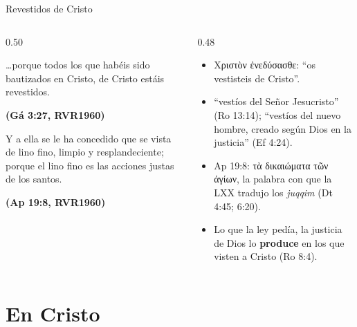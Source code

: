 \documentclass[hyperref={bookmarks=false},aspectratio=169]{beamer}
\newcommand{\grc}[1]{\foreignlanguage{ancientgreek}{#1}}
\newcommand{\fuente}[1]{\par\hfill{\upshape\bfseries\footnotesize\textcolor{azul}{#1}}}
\newcommand{\destacar}[1]{\textbf{\textcolor{azul}{#1}}}
\begin{document}
\begin{frame}{Revestidos de Cristo}
\begin{columns}[c,onlytextwidth]
\begin{column}{0.50\textwidth}
\begin{cita}\ldots{}porque todos los que habéis sido bautizados en Cristo, de Cristo estáis revestidos.\fuente{(Gá 3:27, RVR1960)}\end{cita}
\begin{cita}Y a ella se le ha concedido que se vista de lino fino, limpio y resplandeciente; porque el lino fino es las acciones justas de los santos.\fuente{(Ap 19:8, RVR1960)}\end{cita}
\end{column}
\begin{column}{0.48\textwidth}\small
\begin{itemize}
\item \grc{Χριστὸν ἐνεδύσασθε}: ``os vestisteis de Cristo''.
\item ``vestíos del Señor Jesucristo'' (Ro 13:14); ``vestíos del nuevo hombre, creado según Dios en la justicia'' (Ef 4:24).
\item Ap 19:8: \grc{τὰ δικαιώματα τῶν ἁγίων}, la palabra con que la LXX tradujo los \emph{juqqim} (Dt 4:45; 6:20).
\item Lo que la ley pedía, la justicia de Dios lo \destacar{produce} en los que visten a Cristo (Ro 8:4).
\end{itemize}
\end{column}
\end{columns}
\end{frame}

\section{En Cristo}
\end{document}
